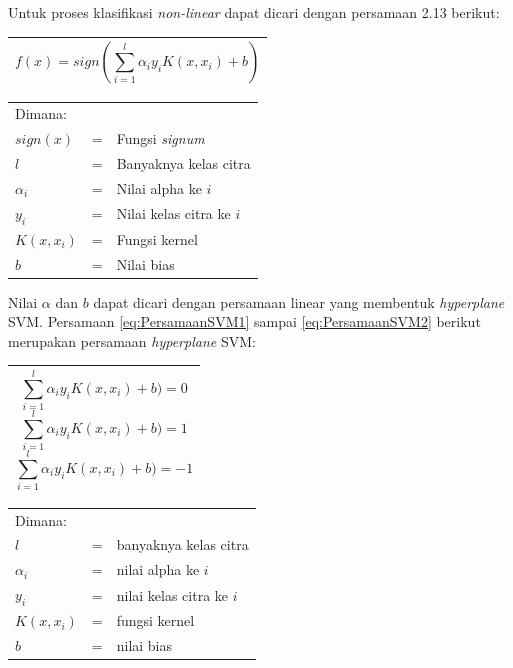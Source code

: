 \noindent Untuk proses klasifikasi \textit{non-linear} dapat dicari dengan persamaan 2.13 berikut:
\begin{table}[H]
	\small
	\begin{adjustbox}{width=1\textwidth}
		\begin{tabular}{|p{13.55cm}|}
			\hline
			\begin{equation}
			f(x) = sign(\sum_{i=1}^{l}\alpha_iy_iK(x,x_i)+b)
			\end{equation}\\
			\hline
		\end{tabular}
	\end{adjustbox}
\end{table}
\noindent
\renewcommand{\arraystretch}{1} 
\begin{tabularx}{\textwidth}{lll}
	Dimana: \\
	$sign(x)$ & = & Fungsi \textit{signum}\\
	$l$ & = & Banyaknya kelas citra\\
	$\alpha_i$ & = & Nilai alpha ke $i$\\
	$y_i$ & = & Nilai kelas citra ke $i$\\
	$K(x,x_i)$ & = & Fungsi kernel\\
	$b$ & = & Nilai bias\\
\end{tabularx}

\noindent Nilai $\alpha$ dan $b$ dapat dicari dengan persamaan linear yang membentuk \textit{hyperplane} SVM. Persamaan \ref{eq:PersamaanSVM1} sampai \ref{eq:PersamaanSVM2} berikut merupakan persamaan \textit{hyperplane} SVM:

\begin{table}[H]
	\small
	\begin{adjustbox}{width=1\textwidth}
		\begin{tabular}{|p{13.55cm}|}
			\hline
			\begin{equation}
			\sum_{i=1}^{l}\alpha_iy_iK(x,x_i)+b)=0
			\label{eq:PersamaanSVM1}
			\end{equation}
			\begin{equation}
			\sum_{i=1}^{l}\alpha_iy_iK(x,x_i)+b)=1
			\end{equation}
			\begin{equation}
			\sum_{i=1}^{l}\alpha_iy_iK(x,x_i)+b)=-1
			\label{eq:PersamaanSVM2}
			\end{equation}\\
			\hline
		\end{tabular}
	\end{adjustbox}
\end{table}
\noindent
\renewcommand{\arraystretch}{1} 
\begin{tabularx}{\textwidth}{lll}
	Dimana: \\
	$l$ & = & banyaknya kelas citra\\
	$\alpha_i$ & = & nilai alpha ke $i$\\
	$y_i$ & = & nilai kelas citra ke $i$\\
	$K(x,x_i)$ & = & fungsi kernel\\
	$b$ & = & nilai bias\\
\end{tabularx}

